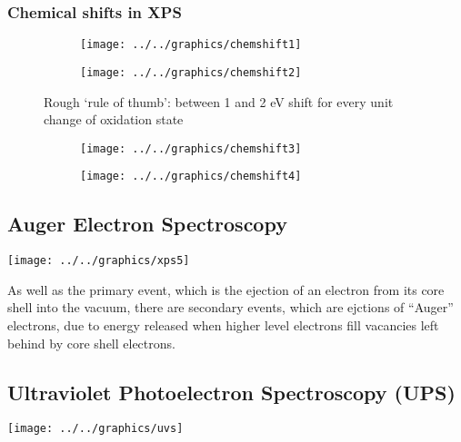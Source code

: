 \documentclass[ignorenonframetext]{beamer}
\begin{document}
\subsubsection{Chemical shifts in XPS}

\begin{figure}[H]
\centering
\begin{subfigure}[b]{.45\textwidth}
\texttt{[image: ../../graphics/chemshift1]}
\end{subfigure}
\begin{subfigure}[b]{.45\textwidth}
\texttt{[image: ../../graphics/chemshift2]}
\end{subfigure}
\caption{Rough ‘rule of thumb’: between 1 and 2 eV shift for every unit change of oxidation state}
\end{figure}

\begin{figure}[H]
\centering
\begin{subfigure}[b]{.45\textwidth}
\texttt{[image: ../../graphics/chemshift3]}
\end{subfigure}
\begin{subfigure}[b]{.45\textwidth}
\texttt{[image: ../../graphics/chemshift4]}
\end{subfigure}
\caption{}
\end{figure}

\subsection{Auger Electron Spectroscopy}

\begin{center}\texttt{[image: ../../graphics/xps5]}\end{center}

As well as the primary event, which is the ejection of an electron from its core shell into the vacuum, there are secondary events, which are ejctions of ``Auger'' electrons, due to energy released when higher level electrons fill vacancies left behind by core shell electrons.

\subsection{Ultraviolet Photoelectron Spectroscopy (UPS)}

\begin{center}\texttt{[image: ../../graphics/uvs]}\end{center}
\end{document}
